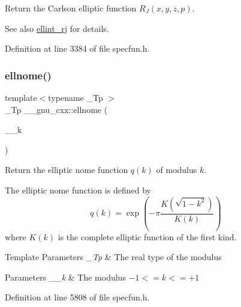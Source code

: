 Return the Carlson elliptic function $ R_J(x,y,z,p) $.

\begin{DoxySeeAlso}{See also}
\hyperlink{group__gnu__math__spec__func_gadccabc8df929cc03745286ed1574a3ba}{ellint\+\_\+rj} for details. 
\end{DoxySeeAlso}


Definition at line 3384 of file specfun.\+h.

\mbox{\label{group__gnu__math__spec__func_ga7bfb34f8b5c0ed7c72040f9cb7034bba}} 
\subsubsection{\texorpdfstring{ellnome()}{ellnome()}}
{\footnotesize\ttfamily template$<$typename \+\_\+\+Tp $>$ \\
\+\_\+\+Tp \+\_\+\+\_\+gnu\+\_\+cxx\+::ellnome (\begin{DoxyParamCaption}\item[{\+\_\+\+Tp}]{\+\_\+\+\_\+k }\end{DoxyParamCaption})\hspace{0.3cm}{\ttfamily [inline]}}

Return the elliptic nome function $ q(k) $ of modulus $ k $.

The elliptic nome function is defined by \[ q(k) = \exp \left(-\pi\frac{K(\sqrt{1-k^2})}{K(k)} \right) \] where $ K(k) $ is the complete elliptic function of the first kind.


\begin{DoxyTemplParams}{Template Parameters}
{\em \+\_\+\+Tp} & The real type of the modulus \\
\hline
\end{DoxyTemplParams}

\begin{DoxyParams}{Parameters}
{\em \+\_\+\+\_\+k} & The modulus $ -1 <= k <= +1 $ \\
\hline
\end{DoxyParams}


Definition at line 5808 of file specfun.\+h.

\mbox{\label{group__gnu__math__spec__func_gad3ba08e5843ea0ec2bb9ddde3033adff}} 
